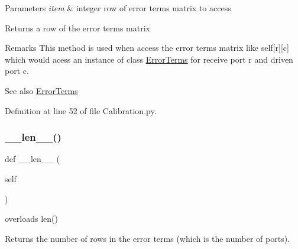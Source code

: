 \begin{DoxyParams}{Parameters}
{\em item} & integer row of error terms matrix to access \\
\hline
\end{DoxyParams}
\begin{DoxyReturn}{Returns}
a row of the error terms matrix 
\end{DoxyReturn}
\begin{DoxyRemark}{Remarks}
This method is used when access the error terms matrix like self\mbox{[}r\mbox{]}\mbox{[}c\mbox{]} which would acess an instance of class \hyperlink{namespaceSignalIntegrity_1_1Measurement_1_1Calibration_1_1ErrorTerms}{Error\+Terms} for receive port r and driven port c. 
\end{DoxyRemark}
\begin{DoxySeeAlso}{See also}
\hyperlink{namespaceSignalIntegrity_1_1Measurement_1_1Calibration_1_1ErrorTerms}{Error\+Terms} 
\end{DoxySeeAlso}


Definition at line 52 of file Calibration.\+py.

\mbox{\label{classSignalIntegrity_1_1Measurement_1_1Calibration_1_1Calibration_1_1Calibration_a810fdc262754b6d21f5acd0e280d4daf}} 
\subsubsection{\texorpdfstring{\+\_\+\+\_\+len\+\_\+\+\_\+()}{\_\_len\_\_()}}
{\footnotesize\ttfamily def \+\_\+\+\_\+len\+\_\+\+\_\+ (\begin{DoxyParamCaption}\item[{}]{self }\end{DoxyParamCaption})}



overloads len() 

\begin{DoxyReturn}{Returns}
the number of rows in the error terms (which is the number of ports). 
\end{DoxyReturn}


